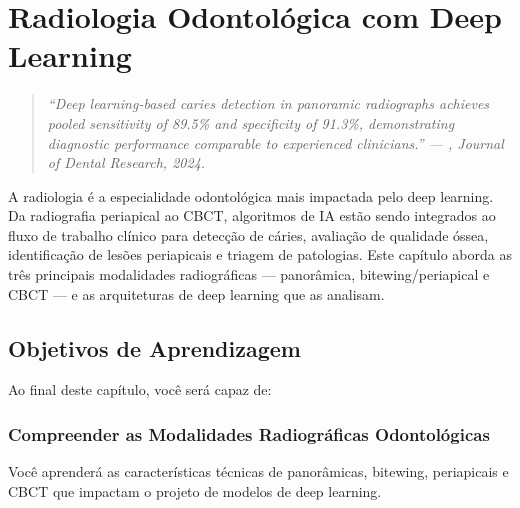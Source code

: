 
\chapter{Radiologia Odontológica com Deep Learning}
\label{cap:radiologia-dl}

\nivelquatro

\begin{quote}
\itshape\small
``Deep learning-based caries detection in panoramic radiographs achieves pooled
sensitivity of 89.5\% and specificity of 91.3\%, demonstrating diagnostic
performance comparable to experienced clinicians.'' --- ,
Journal of Dental Research, 2024.
\end{quote}

A radiologia é a especialidade odontológica mais impactada pelo deep learning.
Da radiografia periapical ao CBCT, algoritmos de IA estão sendo integrados ao
fluxo de trabalho clínico para detecção de cáries, avaliação de qualidade óssea,
identificação de lesões periapicais e triagem de patologias. Este capítulo aborda
as três principais modalidades radiográficas --- panorâmica, bitewing/periapical
e CBCT --- e as arquiteturas de deep learning que as analisam.


\section{Objetivos de Aprendizagem}

Ao final deste capítulo, você será capaz de:

\subsection{Compreender as Modalidades Radiográficas Odontológicas}
Você aprenderá as características técnicas de panorâmicas, bitewing, periapicais e CBCT que impactam o projeto de modelos de deep learning.

